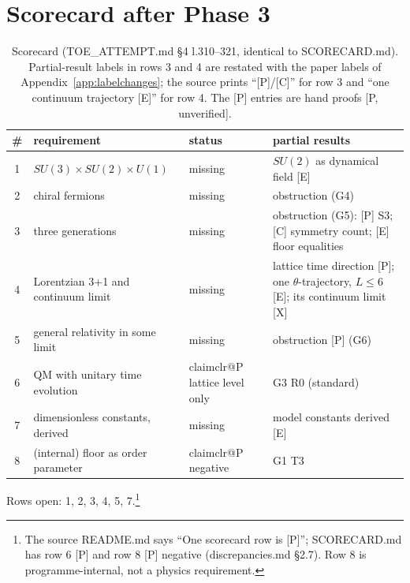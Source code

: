 \documentclass[11pt]{article}
\makeatletter
\newcommand\claimtag[1]{\ifcsname claimclr@#1\endcsname
  \fcolorbox{\csname claimclr@#1\endcsname}{\csname claimclr@#1\endcsname!12}{\sffamily\bfseries\scriptsize\textcolor{\csname claimclr@#1\endcsname}{[#1]}}%
  \else\fcolorbox{black}{white}{\sffamily\bfseries\scriptsize [#1]}\fi}
\makeatother
\begin{document}
\section{Scorecard after Phase 3}\label{sec:scorecard}
\begin{table}[h]\centering\small
\caption{Scorecard (TOE\_ATTEMPT.md \S4 l.310--321, identical to SCORECARD.md). Partial-result labels in rows 3 and 4 are restated with the paper labels of Appendix~\ref{app:labelchanges}; the source prints ``[P]/[C]'' for row 3 and ``one continuum trajectory [E]'' for row 4. The [P] entries are hand proofs [P, unverified].}
\begin{tabular}{@{}cp{}p{}p{}@{}}\toprule
\# & requirement & status & partial results\\\midrule
1 & $SU(3)\times SU(2)\times U(1)$ & missing & $SU(2)$ as dynamical field [E]\\
2 & chiral fermions & missing & obstruction (G4)\\
3 & three generations & missing & obstruction (G5): [P] S3; [C] symmetry count; [E] floor equalities\\
4 & Lorentzian 3+1 and continuum limit & missing & lattice time direction [P]; one $\theta$-trajectory, $L\le6$ [E]; its continuum limit [X]\\
5 & general relativity in some limit & missing & obstruction [P] (G6)\\
6 & QM with unitary time evolution & \claimtag{P} lattice level only & G3 R0 (standard)\\
7 & dimensionless constants, derived & missing & model constants derived [E]\\
8 & (internal) floor as order parameter & \claimtag{P} negative & G1 T3\\\bottomrule
\end{tabular}
\end{table}
Rows open: 1, 2, 3, 4, 5, 7.\footnote{The source README.md says ``One scorecard row is [P]''; SCORECARD.md has row 6 [P] and row 8 [P] negative (discrepancies.md \S2.7). Row 8 is programme-internal, not a physics requirement.}
\end{document}
